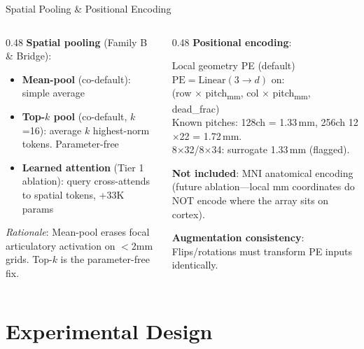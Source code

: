 \documentclass[aspectratio=169, 11pt]{beamer}
\begin{document}
\begin{frame}{Spatial Pooling \& Positional Encoding}

\begin{columns}[T]
\begin{column}{0.48\textwidth}
\textbf{Spatial pooling} (Family B \& Bridge):
\begin{itemize}
  \item \textbf{Mean-pool} (co-default): simple average
  \item \textbf{Top-$k$ pool} (co-default, $k$=16): average $k$ highest-norm tokens. Parameter-free
  \item \textbf{Learned attention} (Tier 1 ablation): query cross-attends to spatial tokens, +33K params
\end{itemize}

\vspace{0.3em}
\small\textit{Rationale}: Mean-pool erases focal articulatory activation on $<$2mm grids. Top-$k$ is the parameter-free fix.

\end{column}
\begin{column}{0.48\textwidth}
\textbf{Positional encoding}:

\begin{block}{\small Local geometry PE (default)}
\small
$\text{PE} = \text{Linear}(3 \to d)$ on:\\
\quad (row $\times$ pitch\textsubscript{mm},\; col $\times$ pitch\textsubscript{mm},\; dead\_frac)\\[4pt]
Known pitches: 128ch = 1.33\,mm, 256ch 12$\times$22 = 1.72\,mm.\\
8$\times$32/8$\times$34: surrogate 1.33\,mm (flagged).
\end{block}

\vspace{0.3em}
\small
\textbf{Not included}: MNI anatomical encoding (future ablation---local mm coordinates do NOT encode where the array sits on cortex).

\vspace{0.2em}
\textbf{Augmentation consistency}: Flips/rotations must transform PE inputs identically.
\end{column}
\end{columns}
\end{frame}

\section{Experimental Design}
\end{document}
